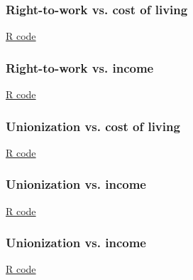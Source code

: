 \documentclass[handout]{beamer}
\begin{document}


   \begin{frame}
   \frametitle{Right-to-work vs. cost of living}
   \begin{center}
   \end{center}
   \href{http://stats191.stanford.edu/review.html}{R code}
   \end{frame}



   \begin{frame}
   \frametitle{Right-to-work vs. income}
   \begin{center}
   \end{center}
   \href{http://stats191.stanford.edu/review.html}{R code}
   \end{frame}



   \begin{frame}
   \frametitle{Unionization vs. cost of living}
   \begin{center}
   \end{center}
   \href{http://stats191.stanford.edu/review.html}{R code}
   \end{frame}



   \begin{frame}
   \frametitle{Unionization vs. income}
   \begin{center}
   \end{center}
   \href{http://stats191.stanford.edu/review.html}{R code}
   \end{frame}



   \begin{frame}
   \frametitle{Unionization vs. income}
   \begin{center}
   \end{center}
   \href{http://stats191.stanford.edu/review.html}{R code}
   \end{frame}
\end{document}

